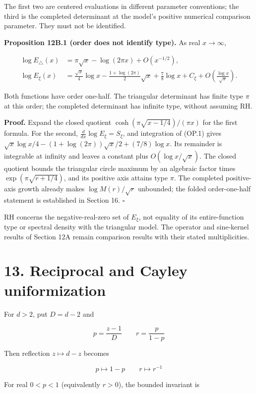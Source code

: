 \documentclass[
  11pt,
]{book}
\begin{document}
The first two are centered evaluations in different parameter
conventions; the third is the completed determinant at the model's
positive numerical comparison parameter. They must not be identified.

\textbf{Proposition 12B.1 (order does not identify type).} As real
\(x\to\infty\),

\[
\begin{aligned}
\log E_\triangle(x)&=\pi\sqrt x-\log(2\pi x)+O(x^{-1/2}),\\
\log E_\xi(x)&=\frac{\sqrt x}{4}\log x
 -\frac{1+\log(2\pi)}2\sqrt x+\frac78\log x+C_\xi
 +O\!\left(\frac{\log x}{\sqrt x}\right).
\end{aligned}
\tag{12B.2}
\]

Both functions have order one-half. The triangular determinant has
finite type \(\pi\) at this order; the completed determinant has
infinite type, without assuming RH.

\textbf{Proof.} Expand the closed quotient
\(\cosh(\pi\sqrt{x-1/4})/(\pi x)\) for the first formula. For the
second, \(\frac{d}{dx}\log E_\xi=S_\xi\), and integration of (OP.1)
gives \(\sqrt x\log x/4-(1+\log(2\pi))\sqrt x/2+(7/8)\log x\). Its
remainder is integrable at infinity and leaves a constant plus
\(O(\log x/\sqrt x)\). The closed quotient bounds the triangular circle
maximum by an algebraic factor times \(\exp(\pi\sqrt{r+1/4})\), and its
positive axis attains type \(\pi\). The completed positive-axis growth
already makes \(\log M(r)/\sqrt r\) unbounded; the folded order-one-half
statement is established in Section 16. \(\square\)

RH concerns the negative-real-zero set of \(E_\xi\), not equality of its
entire-function type or spectral density with the triangular model. The
operator and sine-kernel results of Section 12A remain comparison
results with their stated multiplicities.

\section{13. Reciprocal and Cayley
uniformization}\label{reciprocal-and-cayley-uniformization}

For \(d>2\), put \(D=d-2\) and

\[
p=\frac{z-1}{D}
\qquad
r=\frac{p}{1-p}
\]

Then reflection \(z\mapsto d-z\) becomes

\[
p\mapsto1-p
\qquad
r\mapsto r^{-1}
\]

For real \(0<p<1\) (equivalently \(r>0\)), the bounded invariant is
\end{document}
